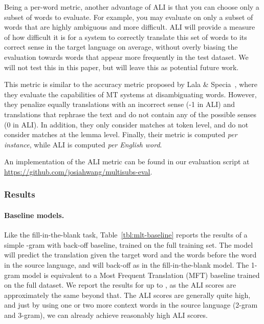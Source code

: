 \documentclass[twocolumn]{svjour3}          \smartqed  \usepackage{graphicx}
\begin{document}
Being a per-word metric, another advantage of ALI is that you can choose only a subset of words to evaluate. For example, you may evaluate on only a subset of words that are highly ambiguous and more difficult. ALI will provide a measure of how difficult it is for a system to correctly translate this set of words to its correct sense in the target language on average, without overly biasing the evaluation towards words that appear more frequently in the test dataset. We will not test this in this paper, but will leave this as potential future work.

This metric is similar to the accuracy metric proposed by Lala \& Specia~\cite{LalaSpecia:2018}, where they evaluate the capabilities of MT systems at disambiguating words. However, they penalize equally translations with an incorrect sense (-1 in ALI) and translations that rephrase the text and do not contain any of the possible senses (0 in ALI). In addition, they only consider matches at token level, and do not consider matches at the lemma level. Finally, their metric is computed \emph{per instance}, while ALI is computed \emph{per English word}. 

An implementation of the ALI metric can be found in our evaluation script at\\ \url{https://github.com/josiahwang/multisubs-eval}.

\subsubsection{Results}
\label{sec:mlt-results}

\paragraph{Baseline models. } Like the fill-in-the-blank task, Table~\ref{tbl:mlt-baseline} reports the results of a simple -gram with back-off baseline, trained on the full training set. The model will predict the translation given the target word and the  words before the word in the source language, and will back-off as in the fill-in-the-blank model. The 1-gram model is equivalent to a Most Frequent Translation (MFT) baseline trained on the full dataset. We report the results for up to , as the ALI scores are approximately the same beyond that. The ALI scores are generally quite high, and just by using one or two more context words in the source language (2-gram and 3-gram), we can already achieve reasonably high ALI scores.
\end{document}
